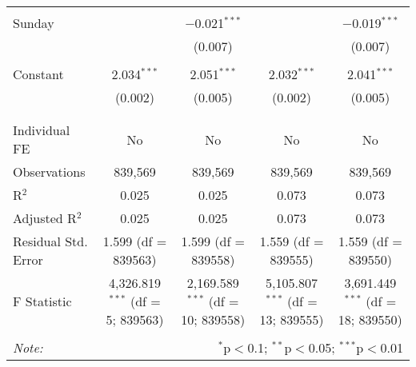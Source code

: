 \documentclass[
]{article}
\begin{document}
\begin{table}[!htbp]
{\begin{tabular}{@{\extracolsep{5pt}}lcccc}
  & & & & \\ 
 Sunday &  & $-$0.021$^{***}$ &  & $-$0.019$^{***}$ \\ 
  &  & (0.007) &  & (0.007) \\ 
  & & & & \\ 
 Constant & 2.034$^{***}$ & 2.051$^{***}$ & 2.032$^{***}$ & 2.041$^{***}$ \\ 
  & (0.002) & (0.005) & (0.002) & (0.005) \\ 
  & & & & \\ 
\hline \\[-1.8ex] 
Individual FE & No & No & No & No \\ 
Observations & 839,569 & 839,569 & 839,569 & 839,569 \\ 
R$^{2}$ & 0.025 & 0.025 & 0.073 & 0.073 \\ 
Adjusted R$^{2}$ & 0.025 & 0.025 & 0.073 & 0.073 \\ 
Residual Std. Error & 1.599 (df = 839563) & 1.599 (df = 839558) & 1.559 (df = 839555) & 1.559 (df = 839550) \\ 
F Statistic & 4,326.819$^{***}$ (df = 5; 839563) & 2,169.589$^{***}$ (df = 10; 839558) & 5,105.807$^{***}$ (df = 13; 839555) & 3,691.449$^{***}$ (df = 18; 839550) \\ 
\hline 
\hline \\[-1.8ex] 
\textit{Note:}  & \multicolumn{4}{r}{$^{*}$p$<$0.1; $^{**}$p$<$0.05; $^{***}$p$<$0.01} \\ 
\end{tabular}
} 
\end{table} 
\newpage
\end{document}
